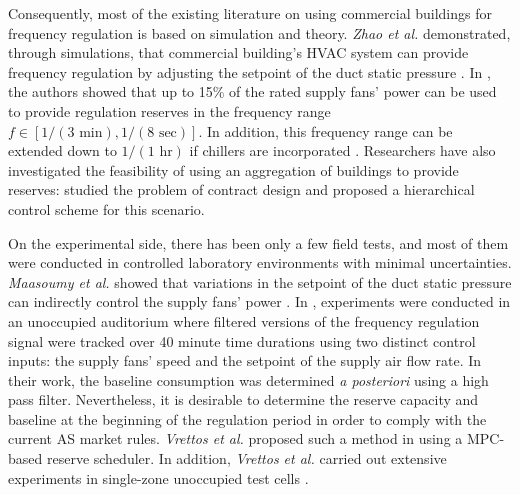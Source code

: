 Consequently, most of the existing literature on using commercial buildings for frequency regulation is based on simulation and theory. 
\textit{Zhao et al.} demonstrated, through simulations, that commercial building's HVAC system can provide frequency regulation by adjusting the setpoint of the duct static pressure \cite{Zhao:2013hvac}.
In \cite{Hao:2014fan}, the authors showed that %
up to 15\% of the rated supply fans' power can be used to provide regulation reserves in the frequency range $f \in [1/(3 \text{~min}), 1/(8 \text{~sec})]$. 
In addition, this frequency range can be extended down to $1/(1 \text{~hr})$ if chillers are incorporated \cite{Lin:2013chiller}.
Researchers have also investigated the feasibility of using an aggregation of buildings to provide reserves: \cite{Balandat:2014contractdesign} studied the problem of contract design and \cite{Vrettos:2014aggregation} proposed a hierarchical control scheme for this scenario.

On the experimental side, there has been only a few field tests, and most of them were conducted in controlled laboratory environments with minimal uncertainties.
\textit{Maasoumy et al.} showed that variations in the setpoint of the duct static pressure can indirectly control the supply fans' power \cite{Maasoumy:2014exp}. %
In \cite{Lin:2015exp}, experiments were conducted in an unoccupied auditorium where filtered versions of the frequency regulation signal were tracked over 40 minute time durations using two distinct control inputs: the supply fans' speed and the setpoint of the supply air flow rate. 
In their work, the baseline consumption was determined \textit{a posteriori} using a high pass filter.
Nevertheless, it is desirable to determine the reserve capacity and baseline at the beginning of the regulation period in order to comply with the current AS market rules. 
\textit{Vrettos et al.} proposed such a method in \cite{Vrettos:2016flexlab1} using a MPC-based reserve scheduler.
In addition, \textit{Vrettos et al.} carried out extensive experiments in single-zone unoccupied test cells \cite{Vrettos:2016flexlab2}.

